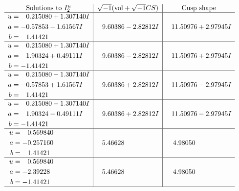 \documentclass[1p]{elsarticle_modified}
\theoremstyle{definition}
\newcommand{\I}{\sqrt{-1}}
\begin{document}
$$\begin{array}{c|c|c}  
\text{Solutions to }I^u_{2}& \I (\text{vol} + \sqrt{-1}CS) & \text{Cusp shape}\\
 \hline 
\begin{aligned}
u &= \phantom{-}0.215080 + 1.307140 I \\
a &= -0.57853 - 1.61567 I \\
b &= \phantom{-}1.41421\phantom{ +0.000000I}\end{aligned}
 & \phantom{-}9.60386 - 2.82812 I & \phantom{-}11.50976 + 2.97945 I \\ \hline\begin{aligned}
u &= \phantom{-}0.215080 + 1.307140 I \\
a &= \phantom{-}1.90324 + 0.49111 I \\
b &= -1.41421\phantom{ +0.000000I}\end{aligned}
 & \phantom{-}9.60386 - 2.82812 I & \phantom{-}11.50976 + 2.97945 I \\ \hline\begin{aligned}
u &= \phantom{-}0.215080 - 1.307140 I \\
a &= -0.57853 + 1.61567 I \\
b &= \phantom{-}1.41421\phantom{ +0.000000I}\end{aligned}
 & \phantom{-}9.60386 + 2.82812 I & \phantom{-}11.50976 - 2.97945 I \\ \hline\begin{aligned}
u &= \phantom{-}0.215080 - 1.307140 I \\
a &= \phantom{-}1.90324 - 0.49111 I \\
b &= -1.41421\phantom{ +0.000000I}\end{aligned}
 & \phantom{-}9.60386 + 2.82812 I & \phantom{-}11.50976 - 2.97945 I \\ \hline\begin{aligned}
u &= \phantom{-}0.569840\phantom{ +0.000000I} \\
a &= -0.257160\phantom{ +0.000000I} \\
b &= \phantom{-}1.41421\phantom{ +0.000000I}\end{aligned}
 & \phantom{-}5.46628\phantom{ +0.000000I} & \phantom{-}4.98050\phantom{ +0.000000I} \\ \hline\begin{aligned}
u &= \phantom{-}0.569840\phantom{ +0.000000I} \\
a &= -2.39228\phantom{ +0.000000I} \\
b &= -1.41421\phantom{ +0.000000I}\end{aligned}
 & \phantom{-}5.46628\phantom{ +0.000000I} & \phantom{-}4.98050\phantom{ +0.000000I}\\
 \hline 
 \end{array}$$\newpage\newpage\renewcommand{\arraystretch}{1}
\end{document}
